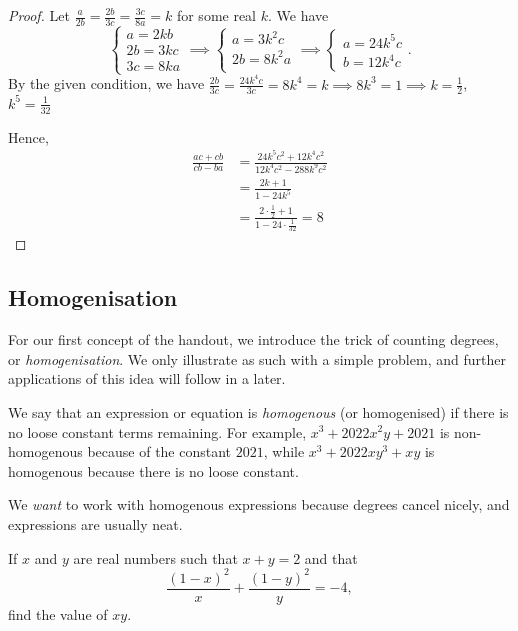 \documentclass[../jarvis.tex]{subfiles}
\begin{document}
\begin{proof}
    Let $\frac{a}{2b}=\frac{2b}{3c}=\frac{3c}{8a}=k$ for some real $k$. We have
$$ 
\begin{cases}
    a=2kb \\
    2b=3kc \\
    3c=8ka
\end{cases}
\implies
\begin{cases}
    a=3k^2c \\
    2b=8k^2a \\
\end{cases}
\implies
\begin{cases}
    a=24k^5c \\
    b=12k^4c    
\end{cases} 
.$$
By the given condition, we have $\frac{2b}{3c}=\frac{24k^4c}{3c}=8k^4=k \implies 8k^3=1 \implies k=\frac{1}{2}$, $k^5=\frac{1}{32}$

Hence,
\begin{align*}
    \frac{ac+cb}{cb-ba}
    &= \frac{24k^5c^2+12k^4c^2}{12k^4c^2-288k^9c^2} \\
    &= \frac{2k+1}{1-24k^5} \\
    &= \frac{2\cdot\frac{1}{2}+1}{1-24\cdot\frac{1}{32}} = \boxed{8}
\end{align*}
\end{proof}

\subsection{Homogenisation}
For our first concept of the handout, we introduce the trick of counting degrees, or \textit{homogenisation}. We only illustrate as such with a simple problem, and further applications of this idea will follow in a later.

\begin{proposition}
    We say that an expression or equation is \textit{homogenous} (or homogenised) if there is no loose constant terms remaining. For example, $x^3+2022x^2y+2021$ is non-homogenous because of the constant $2021$, while $x^3+2022xy^3+xy$ is homogenous because there is no loose constant. 

    We \textit{want} to work with homogenous expressions because degrees cancel nicely, and expressions are usually neat. 
\end{proposition}
\begin{example}
    If $x$ and $y$ are real numbers such that $x+y=2$ and that
    $$\frac{(1-x)^2}{x}+\frac{(1-y)^2}{y}=-4,$$
    find the value of $xy$.
\end{example}
\end{document}
